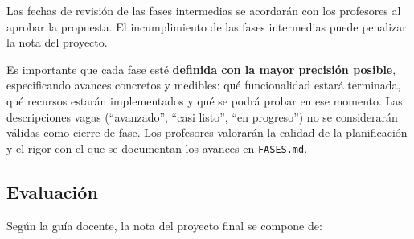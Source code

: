 Las fechas de revisión de las fases intermedias se acordarán con los profesores al aprobar la propuesta. El incumplimiento de las fases intermedias puede penalizar la nota del proyecto.

Es importante que cada fase esté \textbf{definida con la mayor precisión posible}, especificando avances concretos y medibles: qué funcionalidad estará terminada, qué recursos estarán implementados y qué se podrá probar en ese momento. Las descripciones vagas (``avanzado'', ``casi listo'', ``en progreso'') no se considerarán válidas como cierre de fase. Los profesores valorarán la calidad de la planificación y el rigor con el que se documentan los avances en \texttt{FASES.md}.

\subsection{Evaluación}
\label{sec:practica-2026-05-ltaw:evaluacion}

Según la guía docente, la nota del proyecto final se compone de:

